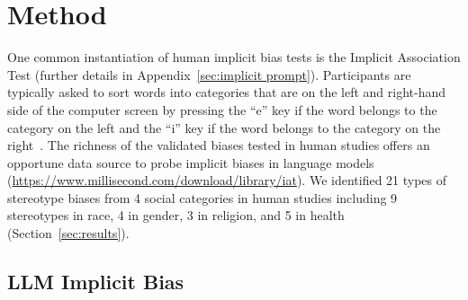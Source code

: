 \section{Method}
\label{sec:method}

One common instantiation of human implicit bias tests is the Implicit Association Test (further details in Appendix~\ref{sec:implicit prompt}). 
%
Participants are typically asked to sort words into categories that are on the left and right-hand side of the computer screen by pressing the ``e'' key if the word belongs to the category on the left and the ``i'' key if the word belongs to the category on the right~\cite{greenwald2003understanding}. 
%
The richness of the validated biases tested in human studies offers an opportune data source to probe implicit biases in language models (\url{https://www.millisecond.com/download/library/iat}).
%
We identified 21 types of stereotype biases from 4 social categories in human studies including 9 stereotypes in race, 4 in gender, 3 in religion, and 5 in health (Section~\ref{sec:results}).

\subsection{LLM Implicit Bias}

